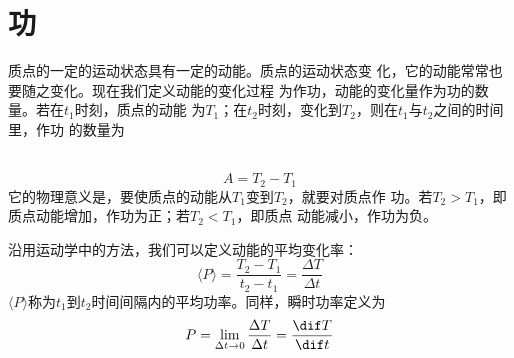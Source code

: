 \documentclass[../outline-of-mechanics.tex]{subfiles}
\begin{document}
\section{功}\label{sec:06.02}

质点的一定的运动状态具有一定的动能。质点的运动状态变
化，它的动能常常也要随之变化。现在我们定义动能的变化过程
为作功，动能的变化量作为功的数量。若在$ t_1 $时刻，质点的动能
为$ T _ { 1 } $；在$ t_2 $时刻，变化到$ T_2 $，则在$ t _ { 1 } $与$ t _ { 2 } $之间的时间里，作功
的数量为

~\vspace{-2em}
\begin{equation}\label{eqn:06.02.01}
  A = T _ { 2 } - T _ { 1 }
\end{equation}
它的物理意义是，要使质点的动能从$ T_1 $变到$ T_2 $，就要对质点作
功。若$ T _ { 2 } > T _ { 1 } $，即质点动能增加，作功为正；若$ T _ { 2 } < T _ { 1 } $，即质点
动能减小，作功为负。

沿用运动学中的方法，我们可以定义动能的平均变化率：
\begin{equation}\label{eqn:06.02.02}
  \langle P \rangle = \frac { T _ { 2 } - T _ { 1 } } { t _ { 2 } - t _ { 1 } } = \frac { \Delta T } { \Delta t }
\end{equation}
$ \langle P \rangle $称为$ t _ { 1 } $到$ t _ { 2 } $时间间隔内的平均功率。同样，瞬时功率定义为
\begin{equation}\label{eqn:06.02.03}
  P = \lim _ { \Delta t \to 0 } \frac { \Delta T } { \Delta t } = \frac { \dif T } { \dif t }
\end{equation}
\end{document}
